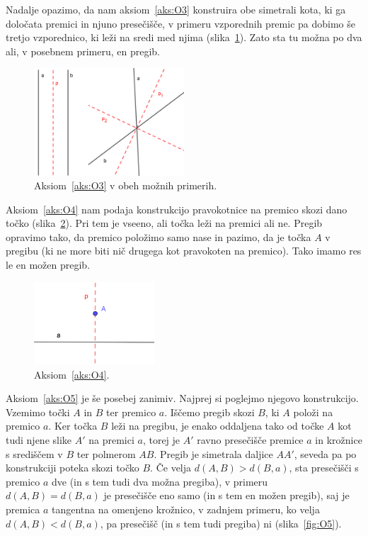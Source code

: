 Nadalje opazimo, da nam aksiom~\ref{aks:O3} konstruira obe simetrali kota, ki ga določata premici in njuno presečišče, v primeru vzporednih premic pa dobimo še tretjo vzporednico, ki leži na sredi med njima (slika~\ref{fig:O3}). Zato sta tu možna po dva ali, v posebnem primeru, en pregib.

\begin{figure}[h!]
    \centering
    \includegraphics[width=0.5\textwidth]{images/origami_aksiomi/O3.png}
    \caption[Aksiom~\ref{aks:O3}]{Aksiom~\ref{aks:O3} v obeh možnih primerih.}
    \label{fig:O3}
\end{figure}

Aksiom~\ref{aks:O4} nam podaja konstrukcijo pravokotnice na premico skozi dano točko (slika~\ref{fig:O4}). Pri tem je vseeno, ali točka leži na premici ali ne. Pregib opravimo tako, da premico položimo samo nase in pazimo, da je točka $A$ v pregibu (ki ne more biti nič drugega kot pravokoten na premico). Tako imamo res le en možen pregib.

\begin{figure}[h!]
    \centering
    \includegraphics[width=0.4\textwidth]{images/origami_aksiomi/O4.png}
    \caption[Aksiom~\ref{aks:O4}]{Aksiom~\ref{aks:O4}.}
    \label{fig:O4}
\end{figure}

Aksiom~\ref{aks:O5} je še posebej zanimiv. Najprej si poglejmo njegovo konstrukcijo. Vzemimo točki $A$ in $B$ ter premico $a$. Iščemo pregib skozi $B$, ki $A$ položi na premico $a$. Ker točka $B$ leži na pregibu, je enako oddaljena tako od točke $A$ kot tudi njene slike $A'$ na premici $a$, torej je $A'$ ravno presečišče premice $a$ in krožnice s središčem v $B$ ter polmerom $AB$. Pregib je simetrala daljice $AA'$, seveda pa po konstrukciji poteka skozi točko $B$. Če velja $ d(A,B) > d(B,a) $, sta presečišči s premico $a$ dve (in s tem tudi dva možna pregiba), v primeru $ d(A,B) = d(B,a) $ je presečišče eno samo (in s tem en možen pregib), saj je premica $a$ tangentna na omenjeno krožnico, v zadnjem primeru, ko velja $ d(A,B) < d(B,a) $, pa presečišč (in s tem tudi pregiba) ni (slika~\ref{fig:O5}).

